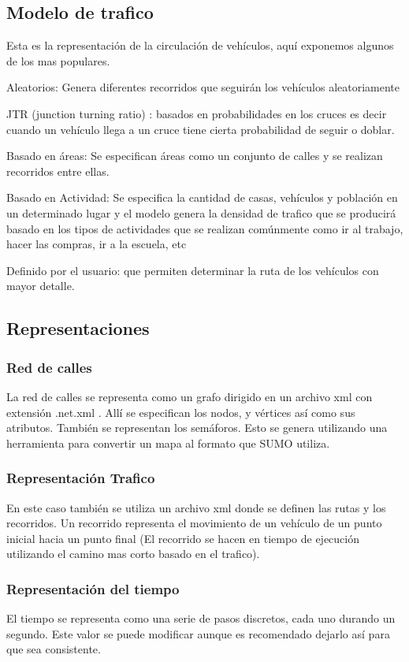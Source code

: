 \subsection{Modelo de trafico }
Esta es la representación de la circulación de vehículos, aquí exponemos algunos de los mas populares. 

Aleatorios: Genera diferentes recorridos que seguirán los vehículos aleatoriamente

JTR (junction turning ratio) : basados en probabilidades en los cruces  es decir cuando un vehículo llega a un cruce tiene cierta probabilidad de seguir o doblar.
 
Basado en áreas:  Se especifican áreas como un conjunto de calles y se realizan recorridos entre ellas.


Basado en Actividad: Se especifica la cantidad de casas, vehículos y población en un determinado lugar y el modelo genera la densidad de trafico que se producirá basado en los tipos de actividades que se realizan comúnmente como ir al trabajo, hacer las compras, ir a la escuela,  etc

Definido por el usuario: que permiten determinar la ruta de los vehículos con mayor detalle.

\subsection{Representaciones}

\subsubsection{Red de calles}
La red de calles se representa como un grafo dirigido en un archivo xml con extensión .net.xml . Allí se especifican los nodos, y vértices así como sus atributos. También se representan los semáforos. Esto  se genera utilizando una herramienta  para convertir un mapa al formato que SUMO utiliza.

\subsubsection{Representación Trafico}
En este caso también se utiliza un archivo xml donde se definen las rutas y los recorridos. Un recorrido representa el movimiento de un vehículo de un punto inicial hacia un punto final (El recorrido se hacen en tiempo de ejecución utilizando el camino mas corto basado en el trafico). 


\subsubsection{Representación del tiempo}
El tiempo se representa como una serie de pasos discretos, cada uno durando un segundo. Este valor se puede modificar aunque es recomendado dejarlo así para que sea consistente.


